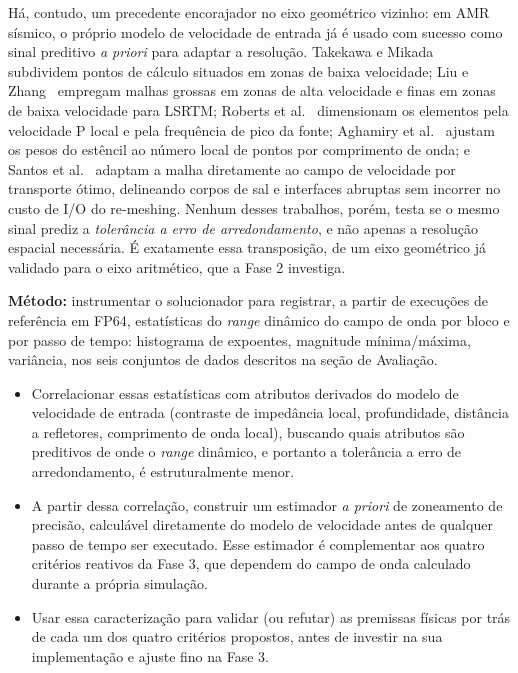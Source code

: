 \documentclass[12pt,a4paper]{article}
\begin{document}
Há, contudo, um precedente encorajador no eixo geométrico vizinho: em AMR
sísmico, o próprio modelo de velocidade de entrada já é usado com sucesso
como sinal preditivo \emph{a priori} para adaptar a resolução. Takekawa e
Mikada~\cite{takekawa2016adaptive} subdividem pontos de cálculo situados em
zonas de baixa velocidade; Liu e Zhang~\cite{liu2020topography} empregam
malhas grossas em zonas de alta velocidade e finas em zonas de baixa
velocidade para LSRTM; Roberts et al.~\cite{roberts2022spyro} dimensionam
os elementos pela velocidade P local e pela frequência de pico da fonte;
Aghamiry et al.~\cite{aghamiry2022wavelength} ajustam os pesos do estêncil
ao número local de pontos por comprimento de onda; e Santos et
al.~\cite{santos2024optimaltransport} adaptam a malha diretamente ao campo
de velocidade por transporte ótimo, delineando corpos de sal e interfaces
abruptas sem incorrer no custo de I/O do re-meshing. Nenhum desses
trabalhos, porém, testa se o mesmo sinal prediz a \emph{tolerância a erro
de arredondamento}, e não apenas a resolução espacial necessária. É
exatamente essa transposição, de um eixo geométrico já validado para o eixo
aritmético, que a Fase 2 investiga.

\textbf{Método:} instrumentar o solucionador para registrar, a partir de
execuções de referência em FP64, estatísticas do \emph{range} dinâmico do
campo de onda por bloco e por passo de tempo: histograma de expoentes,
magnitude mínima/máxima, variância, nos seis conjuntos de dados descritos
na seção de Avaliação.

\begin{itemize}
  \item Correlacionar essas estatísticas com atributos derivados do
        modelo de velocidade de entrada (contraste de impedância local,
        profundidade, distância a refletores, comprimento de onda local),
        buscando quais atributos são preditivos de onde o \emph{range}
        dinâmico, e portanto a tolerância a erro de arredondamento,
        é estruturalmente menor.
  \item A partir dessa correlação, construir um estimador \emph{a priori}
        de zoneamento de precisão, calculável diretamente do modelo de
        velocidade antes de qualquer passo de tempo ser executado. Esse
        estimador é complementar aos quatro critérios reativos da Fase 3,
        que dependem do campo de onda calculado durante a própria
        simulação.
  \item Usar essa caracterização para validar (ou refutar) as premissas
        físicas por trás de cada um dos quatro critérios propostos, antes
        de investir na sua implementação e ajuste fino na Fase 3.
\end{itemize}
\end{document}
